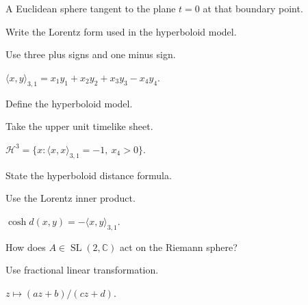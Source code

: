 \begin{solution}
A Euclidean sphere tangent to the plane \(t=0\) at that boundary point.
\end{solution}

\begin{exercise}\label{exr:vii36-09}
Write the Lorentz form used in the hyperboloid model.
\end{exercise}

\begin{hint}
Use three plus signs and one minus sign.
\end{hint}

\begin{solution}
\(\langle x,y\rangle_{3,1}=x_1y_1+x_2y_2+x_3y_3-x_4y_4\).
\end{solution}

\begin{exercise}\label{exr:vii36-10}
Define the hyperboloid model.
\end{exercise}

\begin{hint}
Take the upper unit timelike sheet.
\end{hint}

\begin{solution}
\(\mathcal H^3=\{x:\langle x,x\rangle_{3,1}=-1,\ x_4>0\}\).
\end{solution}

\begin{exercise}\label{exr:vii36-11}
State the hyperboloid distance formula.
\end{exercise}

\begin{hint}
Use the Lorentz inner product.
\end{hint}

\begin{solution}
\(\cosh d(x,y)=-\langle x,y\rangle_{3,1}\).
\end{solution}

\begin{exercise}\label{exr:vii36-12}
How does \(A\in\operatorname{SL}(2,\mathbb C)\) act on the Riemann sphere?
\end{exercise}

\begin{hint}
Use fractional linear transformation.
\end{hint}

\begin{solution}
\(z\mapsto(az+b)/(cz+d)\).
\end{solution}

